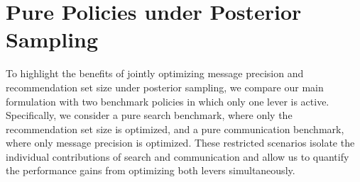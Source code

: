 \documentclass[12pt]{article}
\theoremstyle{definition}
\theoremstyle{remark}
\begin{document}
\appendix
\section{Pure Policies under Posterior Sampling}
\label{sec:pure_strategies}

To highlight the benefits of jointly optimizing message precision and recommendation set size under posterior sampling, we compare our main formulation with two benchmark policies in which only one lever is active. Specifically, we consider a pure search benchmark, where only the recommendation set size is optimized, and a pure communication benchmark, where only message precision is optimized. These restricted scenarios isolate the individual contributions of search and communication and allow us to quantify the performance gains from optimizing both levers simultaneously.
\end{document}
